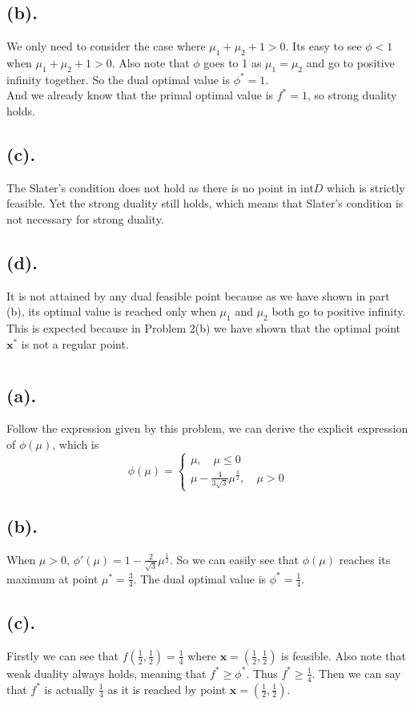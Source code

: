 \documentclass[12pt,letterpaper]{article}
\begin{document}
\subsection*{(b).}
We only need to consider the case where $\mu_1+\mu_2+1>0$. Its easy to see $\phi<1$ when $\mu_1+\mu_2+1>0$. Also note that $\phi$ goes to 1 as $\mu_1=\mu_2$ and go to positive infinity together. So the dual optimal value is $\phi^*=1$. \\
And we already know that the primal optimal value is $f^*=1$, so strong duality holds.
\subsection*{(c).}
The Slater's condition does not hold as there is no point in int$D$ which is strictly feasible. Yet the strong duality still holds, which means that Slater's condition is not necessary for strong duality.
\subsection*{(d).}
It is not attained by any dual feasible point because as we have shown in part (b), its optimal value is reached only when $\mu_1$ and $\mu_2$ both go to positive infinity. This is expected because in Problem 2(b) we have shown that the optimal point $\boldsymbol{x}^*$ is not a regular point.
\section{}
\subsection*{(a).}
Follow the expression given by this problem, we can derive the explicit expression of $\phi(\mu)$, which is 
$$\phi(\mu)=\begin{cases}
\mu, \quad \mu\leq0\\
\mu-\frac{4}{3\sqrt{3}}\mu^{\frac{3}{2}},\quad \mu >0
\end{cases}
$$
\subsection*{(b).}
When $\mu>0$, $\phi'(\mu)=1-\frac{2}{\sqrt{3}}\mu^{\frac{1}{2}}$. So we can easily see that $\phi(\mu)$ reaches its maximum at point $\mu^*=\frac{3}{4}$. The dual optimal value is $\phi^*=\frac{1}{4}$.
\subsection*{(c).}
Firstly we can see that $f(\frac{1}{2},\frac{1}{2})=\frac{1}{4}$ where $\boldsymbol{x}=(\frac{1}{2},\frac{1}{2})$ is feasible. Also note that weak duality always holds, meaning that $f^*\geq\phi^*$. Thus $f^*\geq\frac{1}{4}$. Then we can say that $f^*$ is actually $\frac{1}{4}$ as it is reached by point $\boldsymbol{x}=(\frac{1}{2},\frac{1}{2})$.
\end{document}
